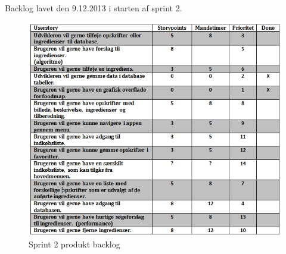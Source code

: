 Backlog lavet den 9.12.2013 i starten af sprint 2. \\
\begin{figure}[H]
\begin{center}
\includegraphics[scale=0.60]{includes/billeder/productbacklog_sprint2.png}
\caption{Sprint 2 produkt backlog}
\label{fig:sprint2:produktbacklog}
\end{center}
\end{figure}
